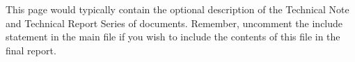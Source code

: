 \begin{abouttntr}
	This page would typically contain the optional description of the Technical Note and Technical Report Series of documents. Remember, uncomment the include statement in the main file if you wish to include the contents of this file in the final report.
\end{abouttntr}